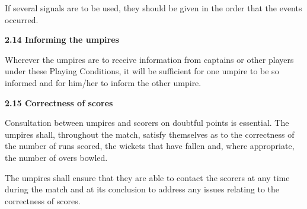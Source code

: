 \documentclass[12pt]{article}
\begin{document}
\vspace{\baselineskip}
\begin{adjustwidth}{0.5in}{0.0in}
{\fontsize{9pt}{10.8pt}\selectfont If several signals are to be used, they should be given in the order that the events occurred.\par}\par

\end{adjustwidth}


\vspace{\baselineskip}
{\fontsize{11pt}{13.2pt}\selectfont \textbf{2.14 \tabto{0.47in} Informing the umpires}\par}\par


\vspace{\baselineskip}
\begin{adjustwidth}{0.0in}{0.03in}
{\fontsize{9pt}{10.8pt}\selectfont Wherever the umpires are to receive information from captains or other players under these Playing Conditions, it will be sufficient for one umpire to be so informed and for him/her to inform the other umpire.\par}\par

\end{adjustwidth}


\vspace{\baselineskip}
{\fontsize{11pt}{13.2pt}\selectfont \textbf{2.15 \tabto{0.47in} Correctness of scores}\par}\par


\vspace{\baselineskip}
\begin{adjustwidth}{0.0in}{0.11in}
{\fontsize{9pt}{10.8pt}\selectfont Consultation between umpires and scorers on doubtful points is essential. The umpires shall, throughout the match, satisfy themselves as to the correctness of the number of runs scored, the wickets that have fallen and, where appropriate, the number of overs bowled.\par}\par

\end{adjustwidth}


\vspace{\baselineskip}
\begin{adjustwidth}{0.0in}{0.08in}
{\fontsize{9pt}{10.8pt}\selectfont The umpires shall ensure that they are able to contact the scorers at any time during the match and at its conclusion to address any issues relating to the correctness of scores.\par}\par

\end{adjustwidth}
\end{document}
